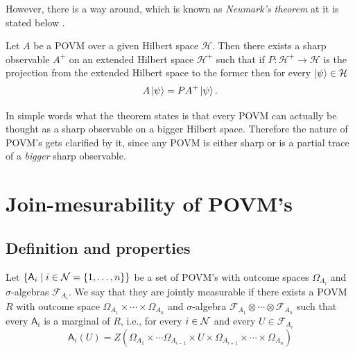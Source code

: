\documentclass[10pt, a4paper]{amsart}
\begin{document}
However, there is a way around, which is known as \textit{Neumark's theorem } at it is stated below \cite{beneduci2014joint}.
\begin{theorem}
Let $A$ be a POVM over a given Hilbert space $\mathcal{H}$. Then there exists a sharp observable $A^{+}$ on an extended Hilbert space $\mathcal{H}^{+}$ such that if $P:\mathcal{H}^{+}\to \mathcal{H}$ is the projection from the extended Hilbert space to the former then for every $\left| \psi\right\rangle\in \mathcal{H}$ 
$$
A\left| \psi\right\rangle  = 
P A^{+}\left| \psi\right\rangle.
$$
\end{theorem} 
In simple words what the theorem states is that every POVM can actually be thought as a sharp observable on a bigger Hilbert space. 
Therefore the nature of POVM's gets clarified by it, since any POVM is either sharp or is a partial trace of a \textit{bigger} sharp observable. 





\newpage
\section{Join-mesurability of POVM's} %
\label{sec:join_mesurability_of_povm}


\subsection{Definition and properties}

\begin{definition}\label{definition:Join_measurability}
Let $\{\mathsf{A}_{i}\mid i\in \mathcal{N}  = \{1, \ldots , n\}\}$ be a set of POVM's with outcome spaces $\Omega_{A_{i}}$ and $\sigma$-algebras $\mathcal{F}_{A_{i}}$. We say that they are jointly measurable if there exists a POVM $R$ with outcome space $ \Omega_{A_{1}}\times \cdots \times \Omega_{A_{n}}$ and $\sigma$-algebra $\mathcal{F}_{A_{1}}\otimes \cdots \otimes \mathcal{F}_{A_{n}}$ such that every $ \mathsf{A}_{i}$ is a marginal of $R$, i.e., for every $i\in \mathcal{N}$ and every $U\in \mathcal{F}_{A_{i}}$
$$
\mathsf{A}_{i}(U) = Z(\Omega_{A_{1}}\times \cdots \Omega_{A_{i-1}}\times U \times \Omega_{A_{i+1}} \times \cdots \times \Omega_{A_{n}} ) 
$$ 

\end{definition}
\end{document}
